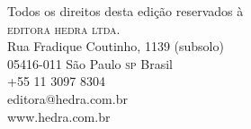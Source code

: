 \documentclass{../../../templates/template_1/livrodaclasse}
\begin{document}
Todos os direitos desta edição reservados à\\
\textsc{editora hedra ltda.}\\
Rua Fradique Coutinho, 1139 (subsolo)\\
05416-011 São Paulo \textsc{sp} Brasil\\
+55 11 3097 8304\\
editora@hedra.com.br\\
www.hedra.com.br
\endgroup
\clearpage

\clearpage

\renewcommand{\contentsname}{Sumário}
\tableofcontents*

\cleardoublepage


\introducao

\cleardoublepage

\part{\titulo}

\openany

\cleardoublepage

\texto

\colofao
\end{document}
